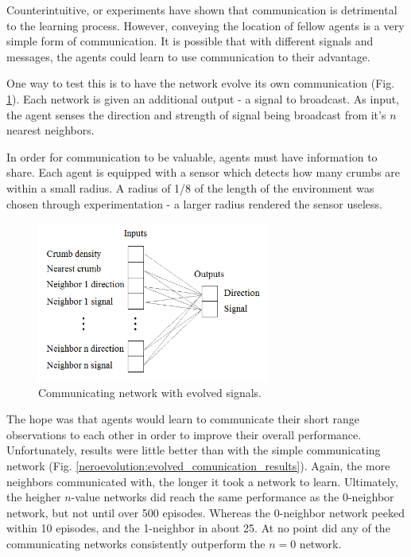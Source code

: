 \documentclass[conference]{IEEEtran}
\begin{document}

Counterintuitive, or experiments have shown that communication is detrimental to the learning process.
However, conveying the location of fellow agents is a very simple form of communication. It is possible that with different signals and messages, the agents could learn to use communication to their advantage.

One way to test this is to have the network evolve its own communication (Fig. \ref{neroevolution:evolved_comunication}). Each network is given an additional output - a signal to broadcast. As input, the agent senses the direction and strength of signal being broadcast from it's $n$ nearest neighbors. 

In order for communication to be valuable, agents must have information to share. 
Each agent is equipped with a sensor which detects how many crumbs are within a small radius. A radius of 1/8 of the length of the environment was chosen through experimentation - a larger radius rendered the sensor useless.

\begin{figure}[t]
\centering
\includegraphics[width=3.0in]{./figures/neroevolution/emerg_comm_network.png}
\caption{Communicating network with evolved signals.}
\label{neroevolution:evolved_comunication}
\end{figure}

The hope was that agents would learn to communicate their short range observations to each other in order to improve their overall performance.
Unfortunately, results were little better than with the simple communicating network (Fig. \ref{neroevolution:evolved_comunication_results}). 
Again, the more neighbors communicated with, the longer it took a network to learn. Ultimately, the heigher $n$-value networks did reach the same performance as the 0-neighbor network, but not until over 500 episodes. Whereas the 0-neighbor network peeked within 10 episodes, and the 1-neighbor in about 25. At no point did any of the communicating networks consistently outperform the $n=0$ network. 
\end{document}
